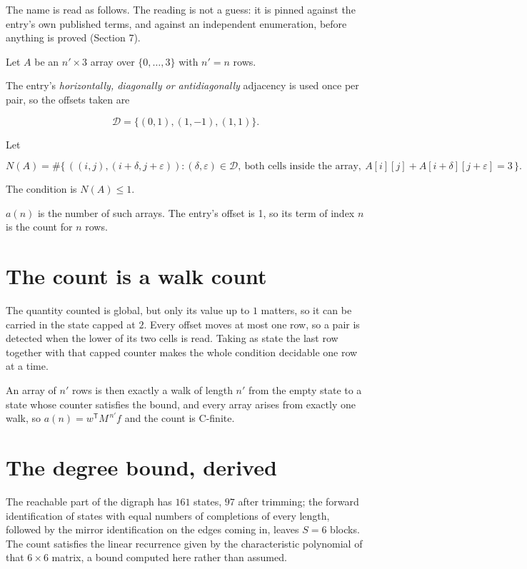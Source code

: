 \documentclass[11pt]{article}
\theoremstyle{definition}
\begin{document}
The name is read as follows. The reading is not a guess: it is pinned against the entry's own published terms, and against an independent enumeration, before anything is proved (Section 7).

Let $A$ be an $n' \times 3$ array over $\{0,\dots,3\}$ with $n' = n$ rows.

The entry's {\itshape horizontally, diagonally or antidiagonally} adjacency is used once per pair, so the offsets taken are

\[\mathcal{D} = \{(0,1), (1,-1), (1,1)\}.\]

Let

\[N(A) = \#\bigl\{\,((i,j),(i{+}\delta,j{+}\varepsilon)) : (\delta,\varepsilon) \in \mathcal{D},\ \text{both cells inside the array},\ A[i][j] + A[i{+}\delta][j{+}\varepsilon] = 3\,\bigr\}.\]

The condition is $N(A) \le 1$.

$a(n)$ is the number of such arrays. The entry's offset is 1, so its term of index $n$ is the count for $n$ rows.

\section{The count is a walk count}

The quantity counted is global, but only its value up to $1$ matters, so it can be carried in the state capped at $2$. Every offset moves at most one row, so a pair is detected when the lower of its two cells is read. Taking as state the last row together with that capped counter makes the whole condition decidable one row at a time.

An array of $n'$ rows is then exactly a walk of length $n'$ from the empty state to a state whose counter satisfies the bound, and every array arises from exactly one walk, so $a(n) = w^{\mathsf T}M^{\,n'}f$ and the count is C-finite.

\section{The degree bound, derived}

The reachable part of the digraph has $161$ states, $97$ after trimming; the forward identification of states with equal numbers of completions of every length, followed by the mirror identification on the edges coming in, leaves $S = 6$ blocks. The count satisfies the linear recurrence given by the characteristic polynomial of that $6\times6$ matrix, a bound computed here rather than assumed.
\end{document}
